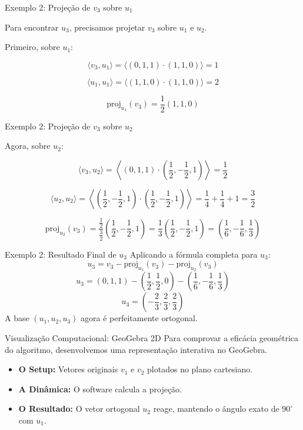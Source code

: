 \documentclass{beamer}
\begin{document}
\begin{frame}{Exemplo 2: Projeção de $v_3$ sobre $u_1$}

Para encontrar $u_3$, precisamos projetar $v_3$ sobre $u_1$ e $u_2$.

\vspace{0.5cm}

Primeiro, sobre $u_1$:

\[
\langle v_3, u_1 \rangle
=
\langle (0,1,1) \cdot (1,1,0) \rangle
=
1
\]

\[
\langle u_1, u_1 \rangle
=
\langle (1,1,0) \cdot (1,1,0) \rangle
=
2
\]

\[
\text{proj}_{u_1}(v_3)
=
\frac12(1,1,0)
\]

\end{frame}

\begin{frame}{Exemplo 2: Projeção de $v_3$ sobre $u_2$}

Agora, sobre $u_2$:

\[
\langle v_3, u_2 \rangle
=
\left\langle
(0,1,1) \cdot
\left(
\frac12,
-\frac12,
1
\right)
\right\rangle
=
\frac12
\]

\[
\langle u_2, u_2 \rangle
=
\left\langle
\left(
\frac12,
-\frac12,
1
\right) \cdot
\left(
\frac12,
-\frac12,
1
\right)
\right\rangle
=
\frac14+\frac14+1
=
\frac32
\]

\[
\text{proj}_{u_2}(v_3)
=
\frac{\frac12}{\frac32}
\left(
\frac12,
-\frac12,
1
\right)
=
\frac13
\left(
\frac12,
-\frac12,
1
\right)
=
\left(
\frac16,
-\frac16,
\frac13
\right)
\]

\end{frame}
\begin{frame}{Exemplo 2: Resultado Final de $u_3$}
Aplicando a fórmula completa para $u_3$:
\[
u_3 = v_3 - \text{proj}_{u_1}(v_3) - \text{proj}_{u_2}(v_3)
\]
\[
u_3 = (0,1,1) - \left(\frac12,\frac12,0\right) - \left(\frac16,-\frac16,\frac13\right)
\]
\[
u_3 = \left(-\frac23,\frac23,\frac23\right)
\]
A base $(u_1, u_2, u_3)$ agora é perfeitamente ortogonal.
\end{frame}
\begin{frame}{Visualização Computacional: GeoGebra 2D}
Para comprovar a eficácia geométrica do algoritmo, desenvolvemos uma representação interativa no GeoGebra.
\vspace{0.3cm}
\begin{itemize}
    \item \textbf{O Setup:} Vetores originais $v_1$ e $v_2$ plotados no plano cartesiano.
    \item \textbf{A Dinâmica:} O software calcula a projeção.
    \item \textbf{O Resultado:} O vetor ortogonal $u_2$ reage, mantendo o ângulo exato de $90^\circ$ com $u_1$.
\end{itemize}
\vspace{0.5cm}
\end{frame}
\end{document}
